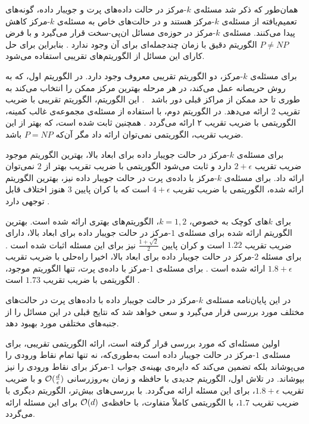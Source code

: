 
همان‌طور که ذکر شد مسئله‌ی $k$-مرکز در حالت داده‌های پرت و جویبار داده، گونه‌های تعمیم‌یافته از مسئله‌ی $k$-مرکز هستند و در حالت‌های خاص به مسئله‌ی $k$-مرکز کاهش پیدا می‌کنند.
مسئله‌ی $k$-مرکز در حوزه‌ی مسائل ان‌پی-سخت قرار می‌گیرد و با فرض $P \neq NP$ الگوریتم دقیق با زمان چندجمله‌ای برای آن وجود ندارد .
بنابراین برای حل کارای این مسائل از الگوریتم‌های تقریبی استفاده می‌شود.

برای مسئله‌ی $k$-مرکز، دو الگوریتم تقریبی معروف وجود دارد.
در الگوریتم اول، که به روش حریصانه عمل می‌کند، در هر مرحله بهترین مرکز ممکن را انتخاب می‌کند به طوری تا حد ممکن از مراکز قبلی دور باشد ~.
این الگوریتم، الگوریتم تقریبی با ضریب تقریب 2 ارائه می‌دهد.
در الگوریتم دوم، با استفاده از مسئله‌ی مجموعه‌ی غالب کمینه، الگوریتمی با ضریب تقریب ۲ ارائه می‌گردد .
همچنین ثابت شده است، که بهتر از این ضریب تقریب، الگوریتمی نمی‌توان ارائه داد مگر آن‌که $P = NP$ باشد.

برای مسئله‌ی $k$-مرکز در حالت جویبار داده برای ابعاد بالا، بهترین الگوریتم موجود ضریب تقریب $2 + \epsilon$ دارد  و ثابت می‌شود الگوریتمی با ضریب تقریب بهتر از $2$ نمی‌توان ارائه داد. برای مسئله‌ی $k$-مرکز با داده‌ی پرت در حالت جویبار داده نیز، بهترین الگوریتم ارائه شده، الگوریتمی با ضریب تقریب $4 + \epsilon$ است که با کران پایین $3$ هنوز اختلاف قابل توجهی دارد . 

برای $k$های کوچک به خصوص، $k =1, 2$، الگوریتم‌های بهتری ارائه شده است. بهترین الگوریتم ارائه شده برای مسئله‌ی $1$-مرکز در حالت جویبار داده برای ابعاد بالا، دارای ضریب تقریب $1.22$ است و کران پایین $\frac{1 + \sqrt{2}}{2}$ نیز برای این مسئله اثبات شده است . برای مسئله $2$-مرکز در حالت جویبار داده برای ابعاد بالا، اخیرا راه‌حلی با ضریب تقریب $1.8 + \epsilon$ ارائه شده است . برای مسئله‌ی $1$-مرکز با داده‌ی پرت، تنها الگوریتم موجود، الگوریتمی با ضریب تقریب $1.73$ است .


در این پایان‌نامه مسئله‌ی $k$-مرکز  در حالت جویبار داده با داده‌های پرت در حالت‌های مختلف مورد بررسی قرار می‌گیرد و سعی خواهد شد که نتایج قبلی در این مسائل را از جنبه‌های مختلفی مورد بهبود دهد.

اولین مسئله‌ای که مورد بررسی قرار گرفته است، ارائه الگوریتمی تقریبی، برای مسئله‌ی $1$-مرکز در حالت جویبار داده است به‌طوری‌که، نه تنها تمام نقاط ورودی را می‌پوشاند بلکه تضمین می‌کند که دایره‌ی بهینه‌ی جواب $1$-مرکز برای نقاط ورودی را نیز بپوشاند.
در تلاش اول، الگوریتم جدیدی با حافظه و زمان به‌روزرسانی $\mathcal{O}(\frac{d}{\epsilon})$ و با ضریب تقریب $1.8 + \epsilon$، برای این مسئله ارائه می‌گردد.
با بررسی‌های بیش‌تر، الگوریتم دیگری با ضریب تقریب $1.7$، با الگوریتمی کاملاً متفاوت، با حافظه‌ی $\mathcal{O}(d)$ برای این مسئله ارائه می‌گردد.

